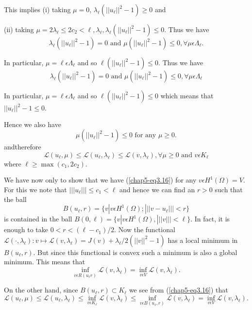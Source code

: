 This implies (i) taking $\mu = 0$, $\lambda_{\ell} (||u_{\ell}||^{2} - 1) \geq 0$ and

(ii) taking $\mu = 2\lambda_{\ell} \leq 2c_{2} < \ell, \lambda_{\ell}, \lambda_{\ell} (||u_{\ell}||^{2} - 1) \leq 0$. Thus we have
$$
\lambda_{\ell} (||u_{\ell}||^{2} - 1) = 0 \text{ and } \mu (||u_{\ell}||^{2} - 1) \leq 0, \forall \mu \epsilon \Lambda_{\ell}.
$$

In particular, $\mu = \ell \epsilon \Lambda_{\ell}$ and so $\ell (||u_{\ell}||^{2} - 1) \leq 0$. Thus we have
$$
\lambda_{\ell} (||u_{\ell}||^{2} - 1) = 0 \text{ and } \mu(||u_{\ell}||^{2} - 1) \leq 0, \forall \mu \epsilon \Lambda_{\ell}
$$

In particular, $\mu = \ell \epsilon \Lambda_{\ell}$ and so $\ell (||u_{\ell}||^{2} - 1) \leq 0$ which means that $||u_{\ell}||^{2} - 1 \leq 0$.

Hence we also have
$$
\mu (||u_{\ell}||^{2} - 1) \leq 0 \text{ for any } \mu \geq 0.
$$
and\pageoriginale therefore
\begin{equation*}
\mathscr{L} (u_{\ell}, \mu) \leq \mathscr{L} (u_{\ell}, \lambda_{\ell}) \leq \mathscr{L} (v, \lambda_{\ell}), \forall \mu \geq 0 \text{ and } v \epsilon K_{\ell}\tag{3.16}\label{chap5-eq3.16}
\end{equation*}
where $\ell \geq \max (c_{1}, 2c_{2})$.

We have now only to show that we have (\ref{chap5-eq3.16}) for any $v \epsilon H^{1} (\Omega) = V$. For this we note that $|||u_{\ell}||| \leq c_{1} < \ell$ and hence we can find an $r > 0$ such that the ball
$$
B(u_{\ell}, r) = \{v | v \epsilon H^{1}(\Omega) ; |||v-u_{\ell}||| < r \}
$$
is contained in the ball $B(0, \ell) = \{v | v \epsilon H^{1} (\Omega), |||v||| < \ell \}$. In fact, it is enough to take $0 < r < (\ell - c_{1}) / 2$. Now the functional $\mathscr{L} (\cdot , \lambda_{\ell}) : v \mapsto \mathscr{L} (v, \lambda_{\ell}) = J(v)  + \lambda_{\ell} / 2 (||v||^{2} - 1)$ has a local minimum in $B(u_{\ell}, r)$. But since this functional is convex such a minimum is also a global minimum. This means that
$$
\inf_{v \epsilon R(u_{\ell} r)} \mathscr{L} (v, \lambda_{\ell}) = \inf_{v \epsilon V} \mathscr{L} (v, \lambda_{\ell}).
$$

On the other hand, since $B(u_{\ell}, r) \subset K_{\ell}$ we see from (\ref{chap5-eq3.16}) that
{\fontsize{10}{12}\selectfont
$$
\mathscr{L} (u_{\ell}, \mu) \leq \mathscr{L} (u_{\ell}, \lambda_{\ell}) \leq \inf_{v \epsilon K_{\ell}} \mathscr{L} (v, \lambda_{\ell}) \leq \inf_{v \epsilon B(u_{\ell}, r)} \mathscr{L} (v, \lambda_{\ell}) = \inf_{v \epsilon V} \mathscr{L} (v, \lambda_{\ell}).
$$}\relax

